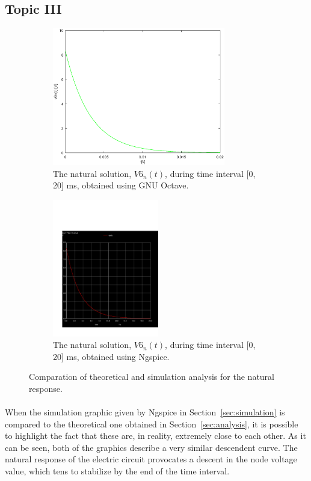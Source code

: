 \subsection{Topic III}
\label{subsec:third_topic_error}

\begin{figure}[H]

\begin{subfigure}{0.5\textwidth}
\includegraphics[width=0.9\linewidth, height=6cm]{natural.eps} 
\caption{The natural solution, $V6_n(t)$, during time interval [0, 20] ms, obtained using GNU Octave.}
\label{fig:theo_third}
\end{subfigure}
\begin{subfigure}{0.5\textwidth}
\includegraphics[width=0.9\linewidth, height=6cm]{trans1.pdf}
\caption{The natural solution, $V6_n(t)$, during time interval [0, 20] ms, obtained using Ngspice.}
\label{fig:natural}
\end{subfigure}

\caption{Comparation of theoretical and simulation analysis for the natural response.}
\label{fig:compar_1}
\end{figure}

\paragraph{}
When the simulation graphic given by Ngspice in Section~\ref{sec:simulation} is compared to the theoretical one obtained in Section~\ref{sec:analysis}, it is possible to highlight the fact that these are, in reality, extremely close to each other. As it can be seen, both of the graphics describe a very similar descendent curve. The natural response of the electric circuit provocates a descent in the node voltage value, which tens to stabilize by the end of the time interval.

